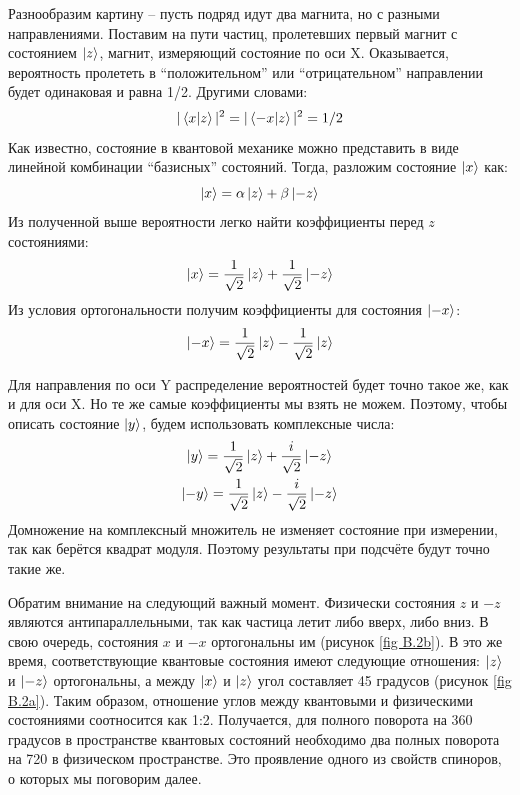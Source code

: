 Разнообразим картину -- пусть подряд идут два магнита, но с разными направлениями. Поставим на пути частиц, пролетевших первый магнит с состоянием $\ket{z}$, магнит, измеряющий состояние по оси X. Оказывается, вероятность пролететь в ``положительном'' или ``отрицательном'' направлении будет одинаковая и равна 1/2. Другими словами:
\[
|\bra{x}\ket{z}|^2 = |\bra{-x}\ket{z}|^2 = 1/2
\]
Как известно, состояние в квантовой механике можно представить в виде линейной комбинации ``базисных'' состояний. Тогда, разложим состояние $\ket{x}$ как:
\[
\ket{x} = \alpha\ket{z} + \beta\ket{-z}
\]
Из полученной выше вероятности легко найти коэффициенты перед $z$ состояниями:
\[
\ket{x} = \frac{1}{\sqrt{2}}\ket{z} + \frac{1}{\sqrt{2}}\ket{-z}
\]
Из условия ортогональности получим коэффициенты для состояния $\ket{-x}$:
\[
\ket{-x} = \frac{1}{\sqrt{2}}\ket{z} - \frac{1}{\sqrt{2}}\ket{z}
\]

Для направления по оси Y распределение вероятностей будет точно такое же, как и для оси X. Но те же самые коэффициенты мы взять не можем. Поэтому, чтобы описать состояние $\ket{y}$, будем использовать комплексные числа:
\begin{gather*}
\ket{y} = \frac{1}{\sqrt{2}}\ket{z} + \frac{i}{\sqrt{2}}\ket{-z}\\
\ket{-y} = \frac{1}{\sqrt{2}}\ket{z} - \frac{i}{\sqrt{2}}\ket{-z}
\end{gather*}
Домножение на комплексный множитель не изменяет состояние при измерении, так как берётся квадрат модуля. Поэтому результаты при подсчёте будут точно такие же.

Обратим внимание на следующий важный момент. Физически состояния $z$ и $-z$ являются антипараллельными, так как частица летит либо вверх, либо вниз. В свою очередь, состояния $x$ и $-x$ ортогональны им (рисунок \ref{fig B.2b}). В это же время, соответствующие квантовые состояния имеют следующие отношения: $\ket{z}$ и $\ket{-z}$ ортогональны, а между $\ket{x}$ и $\ket{z}$ угол составляет 45 градусов (рисунок \ref{fig B.2a}). Таким образом, отношение углов между квантовыми и физическими состояниями соотносится как 1:2. Получается, для полного поворота на 360 градусов в пространстве квантовых состояний необходимо два полных поворота на 720 в физическом пространстве. Это проявление одного из свойств спиноров, о которых мы поговорим далее.

